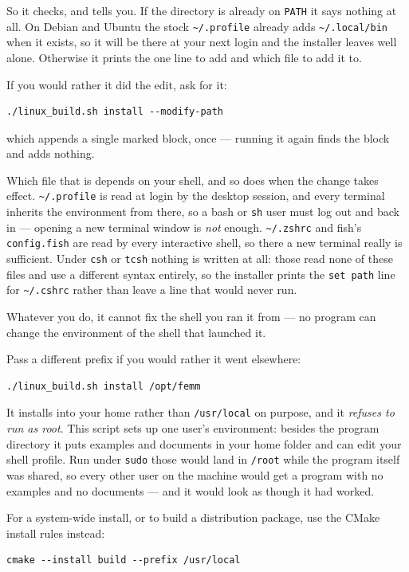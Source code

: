 \documentclass[11pt]{article}
\begin{document}
So it checks, and tells you.  If the directory is already on \texttt{PATH}
it says nothing at all.  On Debian and Ubuntu the stock
\texttt{\textasciitilde/.profile} already adds
\texttt{\textasciitilde/.local/bin} when it exists, so it will be there at
your next login and the installer leaves well alone.  Otherwise it prints
the one line to add and which file to add it to.

If you would rather it did the edit, ask for it:
\begin{lstlisting}
./linux_build.sh install --modify-path
\end{lstlisting}
which appends a single marked block, once --- running it again finds the
block and adds nothing.

Which file that is depends on your shell, and so does when the change takes
effect.  \texttt{\textasciitilde/.profile} is read at login by the desktop
session, and every terminal inherits the environment from there, so a bash
or \texttt{sh} user must log out and back in --- opening a new terminal
window is \emph{not} enough.  \texttt{\textasciitilde/.zshrc} and fish's
\texttt{config.fish} are read by every interactive shell, so there a new
terminal really is sufficient.  Under \texttt{csh} or \texttt{tcsh} nothing
is written at all: those read none of these files and use a different syntax
entirely, so the installer prints the \texttt{set path} line for
\texttt{\textasciitilde/.cshrc} rather than leave a line that would never run.

Whatever you do, it cannot fix the shell you ran it from --- no program can
change the environment of the shell that launched it.

Pass a different prefix if you would rather it went elsewhere:
\begin{lstlisting}
./linux_build.sh install /opt/femm
\end{lstlisting}

It installs into your home rather than \texttt{/usr/local} on purpose,
and it \emph{refuses to run as root}.  This script sets up one user's
environment: besides the program directory it puts examples and documents
in your home folder and can edit your shell profile.  Run under
\texttt{sudo} those would land in \texttt{/root} while the program itself
was shared, so every other user on the machine would get a program with
no examples and no documents --- and it would look as though it had
worked.

For a system-wide install, or to build a distribution package, use the
CMake install rules instead:
\begin{lstlisting}
cmake --install build --prefix /usr/local
\end{lstlisting}
\end{document}
